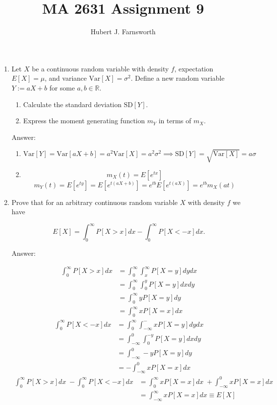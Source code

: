\documentclass{article}
\title{MA 2631 Assignment 9}
\author{Hubert J. Farnsworth}
\begin{document}
\maketitle

\begin{enumerate}

\item

Let $X$ be a continuous random variable with density $f$, expectation $E[X] = \mu$, and variance $\text{Var}[X] = \sigma^2$. Define a new random variable $Y:= aX+b$ for some $a,b \in \mathbb{R}$. 

\begin{enumerate}
\item Calculate the standard deviation $\text{SD}[Y]$. 

\item Express the moment generating function $m_Y$ in terms of $m_X$. 
\end{enumerate}

Answer:

\begin{enumerate}
\item
$$
\text{Var}[Y] = \text{Var}[aX + b] = a^2 \text{Var}[X] = a^2\sigma^2 \implies \text{SD}[Y] = \sqrt{\text{Var}[X]} = \boxed{a\sigma}
$$

\item
$$
m_X(t) = E[e^{tx}]
$$
$$
m_Y(t) = E[e^{ty}] = E[e^{t(aX+b)}]
= e^{tb}E[e^{t(aX)}] = \boxed{e^{tb}m_X(at)}
$$
\end{enumerate}

\newpage
\item

Prove that for an arbitrary continuous random variable $X$ with density $f$ we have 

$$
E[X] = \int_0^\infty P[X > x] dx - \int_0^\infty P[X < -x] dx .
$$

Answer: 

\begin{align*}
\int_0^\infty P[X > x] dx &= \int_0^\infty \int_x^\infty P[X = y] dy dx \\
&= \int_0^\infty \int_0^y P[X = y] dx dy \\
&= \int_0^\infty y P[X = y] dy \\
&= \int_0^\infty xP[X = x] dx
\end{align*}
\begin{align*}
\int_0^\infty P[X < -x] dx &= \int_0^\infty \int_{-\infty}^-x P[X = y] dy dx \\
&= \int_{-\infty}^0 \int_0^{-y} P[X = y] dx dy \\
&= \int_{-\infty}^0 -y P[X = y] dy \\
&= -\int_{-\infty}^0 xP[X = x] dx
\end{align*}
\begin{align*}
\int_0^\infty P[X > x] dx \;- \int_0^\infty P[X < -x] dx &= 
\int_0^\infty xP[X = x] dx \;+ \int_{-\infty}^0 x P[X = x] dx \\
&=
\int_{-\infty}^\infty xP[X = x] dx 
\equiv E[X]
\end{align*}



\end{enumerate}
\end{document}
